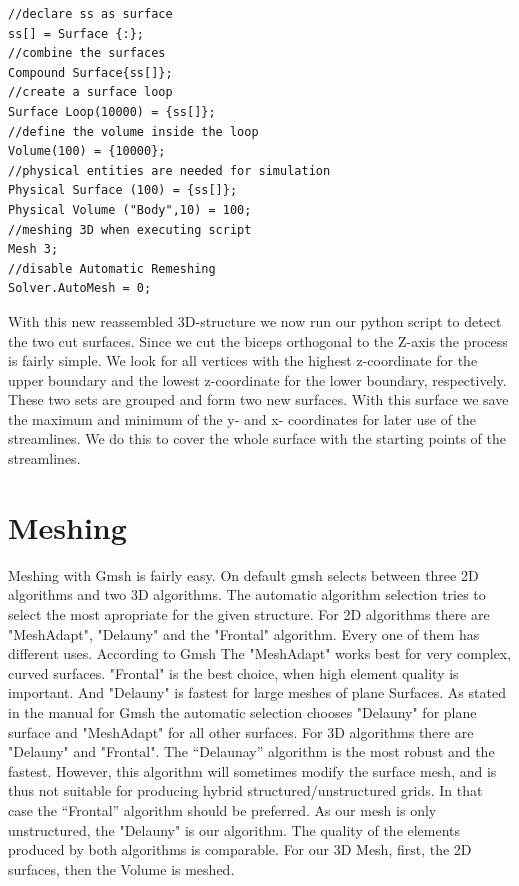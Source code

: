 \documentclass[preprint,journal]{vgtc}       %
\begin{document}
\begin{verbatim}
//declare ss as surface
ss[] = Surface {:};
//combine the surfaces
Compound Surface{ss[]};
//create a surface loop
Surface Loop(10000) = {ss[]};
//define the volume inside the loop
Volume(100) = {10000};
//physical entities are needed for simulation
Physical Surface (100) = {ss[]};
Physical Volume ("Body",10) = 100;
//meshing 3D when executing script
Mesh 3;
//disable Automatic Remeshing
Solver.AutoMesh = 0;
\end{verbatim}

With this new reassembled 3D-structure we now run our python script to detect the two cut surfaces. Since we cut the biceps orthogonal to the Z-axis the process is fairly simple. We look for all vertices with the highest z-coordinate for the upper boundary and the lowest z-coordinate for the lower boundary, respectively. These two sets are grouped and form two new surfaces. With this surface we save the maximum and minimum of the y- and x- coordinates for later use of the streamlines. We do this to cover the whole surface with the starting points of the streamlines.

\section{Meshing}
Meshing with Gmsh is fairly easy. On default gmsh selects between three 2D algorithms and two 3D algorithms.
The automatic algorithm selection tries to select the most apropriate for the given structure.
For 2D algorithms there are "MeshAdapt", "Delauny" and the "Frontal" algorithm. Every one of them has different uses. According to Gmsh The "MeshAdapt" works best for very complex, curved surfaces. "Frontal" is the best choice, when high element quality is important. And "Delauny" is fastest for large meshes of plane Surfaces.
As stated in the manual for Gmsh the automatic selection chooses "Delauny" for plane surface and "MeshAdapt" for all other surfaces. 
For 3D algorithms there are "Delauny" and "Frontal". The “Delaunay” algorithm is the most robust and the fastest. However, this algorithm will sometimes modify the surface mesh, and is thus not suitable for producing hybrid structured/unstructured grids. In that case the “Frontal” algorithm should be preferred. As our mesh is only unstructured, the "Delauny" is our algorithm. The quality of the elements produced by both algorithms is comparable.
For our 3D Mesh, first, the 2D surfaces, then the Volume is meshed.
%	
\end{document}
